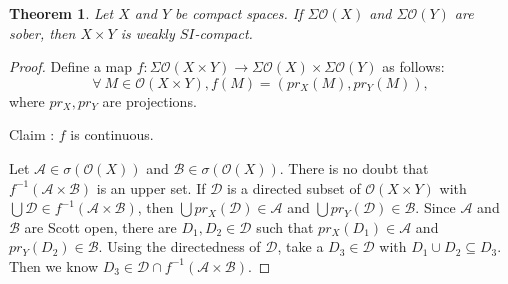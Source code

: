 \documentclass[preprint,12pt]{elsarticle}
\numberwithin{equation}{section}
\newtheorem{theorem}{Theorem}[section]
\begin{document}
\begin{theorem} Let $X$ and $Y$ be compact spaces. If $\Sigma \mathcal{O}(X)$ and $\Sigma \mathcal{O}(Y)$ are sober, then $X\times Y$ is weakly $SI$-compact.

\end{theorem}

\begin{proof}Define a map $f:\Sigma\mathcal{O}(X\times Y)\longrightarrow\Sigma \mathcal{O}(X)\times\Sigma \mathcal{O}(Y)$ as follows:
$$\forall\ M\in\mathcal{O}(X\times Y), f(M)=(pr_{X}(M),pr_{Y}(M)),$$ where $pr_{X},pr_{Y}$ are projections.

Claim : $f$ is continuous.

Let $\mathcal{A}\in\sigma(\mathcal{O}(X))$ and $\mathcal{B}\in\sigma(\mathcal{O}(X))$. There is no doubt that $f^{-1}(\mathcal{A}\times\mathcal{B})$ is an upper set. If $\mathcal{D}$ is a directed subset of $\mathcal{O}(X\times Y)$ with $\bigcup\mathcal{D}\in f^{-1}(\mathcal{A}\times\mathcal{B})$, then $\bigcup pr_{X}(\mathcal{D})\in\mathcal{A}$ and $\bigcup pr_{Y}(\mathcal{D})\in\mathcal{B}$. Since $\mathcal{A}$ and $\mathcal{B}$ are Scott open, there are $D_{1},D_{2}\in\mathcal{D}$ such that $pr_{X}(D_{1})\in\mathcal{A}$ and $pr_{Y}(D_{2})\in\mathcal{B}$. Using the directedness of $\mathcal{D}$, take a $D_{3}\in\mathcal{D}$ with $D_{1}\cup D_{2}\subseteq D_{3}$. Then we know $D_{3}\in\mathcal{D}\cap f^{-1}(\mathcal{A}\times\mathcal{B})$.


\end{proof}
\end{document}
